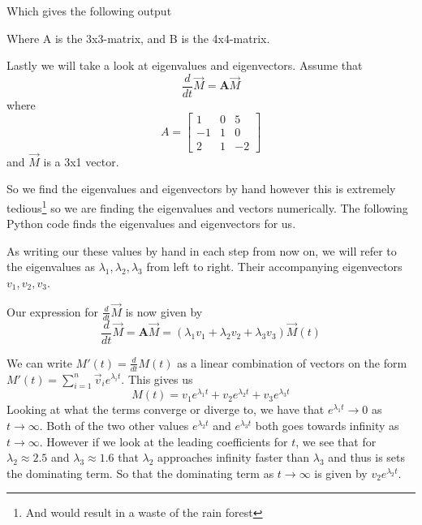 \documentclass[10pt, a4paper]{amsart}
\begin{document}


Which gives the following output
 
Where A is the 3x3-matrix, and B is the 4x4-matrix. 

Lastly we will take a look at eigenvalues and eigenvectors. Assume that 
\begin{equation}
\frac{d}{dt}\vec{M} = \mathbf{A}\vec{M}
\end{equation}
where
\begin{equation}
A = \begin{bmatrix}
1 & 0 & 5\\
-1 & 1 & 0\\
2 & 1 & -2
\end{bmatrix}
\end{equation}
and $\vec{M}$ is a 3x1 vector. 

So we find the eigenvalues and eigenvectors by hand however this is extremely tedious\footnote{And would result in a waste of the rain forest} so we are finding the eigenvalues and vectors numerically. The following Python code finds the eigenvalues and eigenvectors for us. 

As writing our these values by hand in each step from now on, we will refer to the eigenvalues as $\lambda_1, \lambda_2, \lambda_3$ from left to right. Their accompanying eigenvectors $v_1, v_2, v_3$. 

Our expression for $\frac{d}{dt}\vec{M}$ is now given by 
\begin{equation}
\frac{d}{dt}\vec{M} = \mathbf{A}\vec{M} = \left(\lambda_1v_1 + \lambda_2v_2 + \lambda_3v_3\right)\vec{M}(t)\label{eq:int_exp}
\end{equation}

We can write $M'(t) = \frac{d}{dt}M(t)$ as a linear combination of vectors on the form $M'(t) = \sum_{i=1}^n\vec{v}_ie^{\lambda_i t}$. This gives us 
\begin{equation}
M(t) = v_1 e^{\lambda_1 t} + v_2 e^{\lambda_2 t}  + v_3 e^{\lambda_3 t} 
\end{equation} 
Looking at what the terms converge or diverge to, we have that $e^{\lambda_1t} \rightarrow 0$ as $t \rightarrow\infty$. Both of the two other values $e^{\lambda_2t}$ and $e^{\lambda_3t}$ both goes towards infinity as $t \rightarrow \infty$. However if we look at the leading coefficients for $t$, we see that for $\lambda_2  \approx 2.5$ and $\lambda_3 \approx 1.6$ that $\lambda_2$ approaches infinity faster than $\lambda_3$ and thus is sets the dominating term. So that the dominating term as $t \rightarrow\infty$ is given by $v_2e^{\lambda_2t}$.
\end{document}
